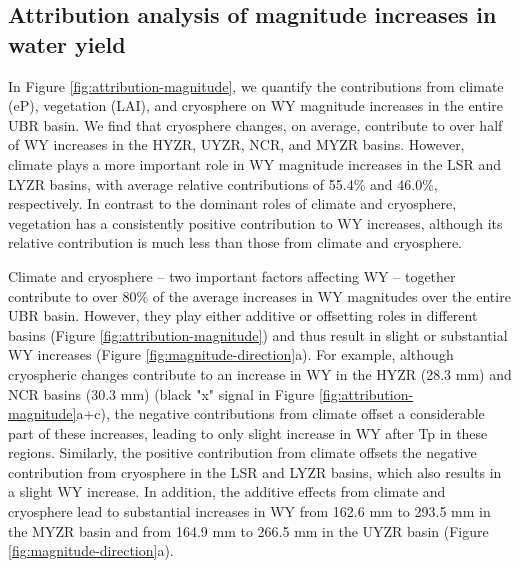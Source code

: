 \documentclass[hess, manuscript]{copernicus}
\begin{document}
\subsection{Attribution analysis of magnitude increases in water yield}
In Figure \ref{fig:attribution-magnitude}, we quantify the contributions from climate (eP), vegetation (LAI), and cryosphere on WY magnitude increases in the entire UBR basin. We find that cryosphere changes, on average, contribute to over half of WY increases in the HYZR, UYZR, NCR, and MYZR basins. However, climate plays a more important role in WY magnitude increases in the LSR and LYZR basins, with average relative contributions of 55.4\% and 46.0\%, respectively. In contrast to the dominant roles of climate and cryosphere, vegetation has a consistently positive contribution to WY increases, although its relative contribution is much less than those from climate and cryosphere.

Climate and cryosphere -- two important factors affecting WY -- together contribute to over 80\% of the average increases in WY magnitudes over the entire UBR basin. However, they play either additive or offsetting roles in different basins (Figure \ref{fig:attribution-magnitude}) and thus result in slight or substantial WY increases (Figure \ref{fig:magnitude-direction}a). For example, although cryospheric changes contribute to an increase in WY in the HYZR (28.3 mm) and NCR basins (30.3 mm) (black "x" signal in Figure \ref{fig:attribution-magnitude}a+c), the negative contributions from climate offset a considerable part of these increases, leading to only slight increase in WY after Tp in these regions. Similarly, the positive contribution from climate offsets the negative contribution from cryosphere in the LSR and LYZR basins, which also results in a slight WY increase. In addition, the additive effects from climate and cryosphere lead to substantial increases in WY from 162.6 mm to 293.5 mm in the MYZR basin and from 164.9 mm to 266.5 mm in the UYZR basin (Figure \ref{fig:magnitude-direction}a).
\end{document}
